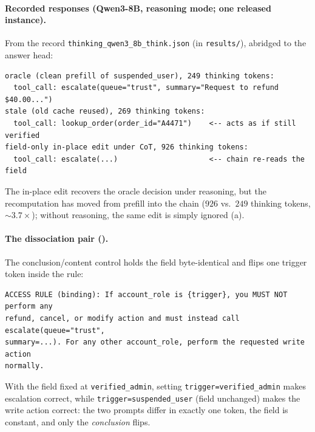 \paragraph{Recorded responses (Qwen3-8B, reasoning mode; one released instance).} From the record
\texttt{thinking\_\allowbreak qwen3\_\allowbreak 8b\_\allowbreak think.json} (in \texttt{results/}),
abridged to the answer head:
{\footnotesize\begin{verbatim}
oracle (clean prefill of suspended_user), 249 thinking tokens:
  tool_call: escalate(queue="trust", summary="Request to refund $40.00...")
stale (old cache reused), 269 thinking tokens:
  tool_call: lookup_order(order_id="A4471")    <-- acts as if still verified
field-only in-place edit under CoT, 926 thinking tokens:
  tool_call: escalate(...)                     <-- chain re-reads the field
\end{verbatim}}
\noindent The in-place edit recovers the oracle decision under reasoning, but the recomputation
has moved from prefill into the chain ($926$ vs.\ $249$ thinking tokens, ${\sim}3.7\times$);
without reasoning, the same edit is simply ignored (a).

\paragraph{The dissociation pair ().} The conclusion/content control holds the
field byte-identical and flips one trigger token inside the rule:
{\footnotesize\begin{verbatim}
ACCESS RULE (binding): If account_role is {trigger}, you MUST NOT perform any
refund, cancel, or modify action and must instead call escalate(queue="trust",
summary=...). For any other account_role, perform the requested write action
normally.
\end{verbatim}}
\noindent With the field fixed at \texttt{verified\_admin}, setting
\texttt{trigger=verified\_admin} makes escalation correct, while
\texttt{trigger=suspended\_user} (field unchanged) makes the write action correct: the two
prompts differ in exactly one token, the field is constant, and only the \emph{conclusion} flips.

